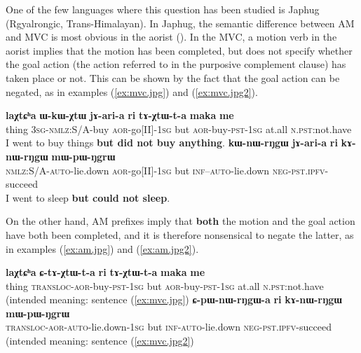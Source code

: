 \documentclass{article}
\newcommand{\ipa}[1]{\textbf{{\phon\mbox{#1}}}} %
\begin{document}
One of the few languages where this question has been studied is Japhug (Rgyalrongic, Trans-Himalayan). In Japhug, the semantic difference between AM and MVC is most obvious in the aorist (\citealt[203]{jacques13harmonization}). In the MVC, a motion verb in the aorist implies that the motion has been completed, but does not specify whether the goal action (the action referred to in the purposive complement clause) has taken place or not. This can be shown by the fact that the goal action can be negated, as in examples (\ref{ex:mvc.jpg}) and  (\ref{ex:mvc.jpg2}).

 \begin{exe}
\ex \label{ex:mvc.jpg}
\gll  \ipa{laχtɕʰa} \ipa{ɯ-kɯ-χtɯ} \ipa{jɤ-ari-a}  \ipa{ri} \ipa{tɤ-χtɯ-t-a} \ipa{maka} \ipa{me} \\
thing \textsc{3sg}-\textsc{nmlz}:S/A-buy \textsc{aor}-go[II]-\textsc{1sg} but \textsc{aor}-buy-\textsc{pst-1sg} at.all \textsc{n.pst}:not.have\\
\glt  I went to buy things \textbf{but did not buy anything}.
\ex \label{ex:mvc.jpg2}
\gll  \ipa{kɯ-nɯ-rŋgɯ}  	\ipa{jɤ-ari-a}  	\ipa{ri}  	\ipa{kɤ-nɯ-rŋgɯ}  	\ipa{mɯ-pɯ-ŋgrɯ}  	\\  
\textsc{nmlz}:S/A-\textsc{auto}-lie.down 	\textsc{aor}-go[II]-\textsc{1sg} but	\textsc{inf}--\textsc{auto}-lie.down 	\textsc{neg-pst.ipfv}-succeed \\
\glt  I went to sleep \textbf{but could not sleep}.
  \end{exe}
  
On the other hand, AM prefixes imply that \textbf{both} the motion and the goal action have both been completed, and it is therefore nonsensical to negate the latter, as in examples (\ref{ex:am.jpg}) and (\ref{ex:am.jpg2}).

 \begin{exe}
\ex \label{ex:am.jpg}
\gll  *\ipa{laχtɕʰa} \ipa{ɕ-tɤ-χtɯ-t-a}  \ipa{ri} \ipa{tɤ-χtɯ-t-a} \ipa{maka} \ipa{me} \\
thing \textsc{transloc}-\textsc{aor}-buy-\textsc{pst-1sg} but \textsc{aor}-buy-\textsc{pst-1sg}  at.all \textsc{n.pst}:not.have\\
\glt  (intended meaning: sentence (\ref{ex:mvc.jpg}) 
\ex \label{ex:am.jpg2}
\gll  *\ipa{ɕ-pɯ-nɯ-rŋgɯ-a}  	\ipa{ri}  	\ipa{kɤ-nɯ-rŋgɯ}  	\ipa{mɯ-pɯ-ŋgrɯ}  \\
\textsc{transloc-aor-auto}-lie.down-\textsc{1sg} but	\textsc{inf-auto}-lie.down 	\textsc{neg-pst.ipfv}-succeed \\
\glt  (intended meaning: sentence (\ref{ex:mvc.jpg2}) 
\end{exe}  
\end{document}
